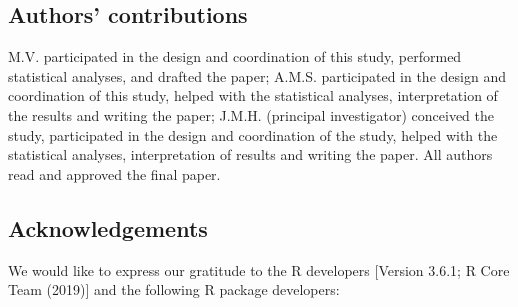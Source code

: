 \documentclass[
  english,
  doc,floatsintext]{apa6}
\begin{document}
\hypertarget{authors-contributions}{%
\subsection{Authors' contributions}\label{authors-contributions}}

M.V. participated in the design and coordination of this study, performed statistical analyses, and drafted the paper; A.M.S. participated in the design and coordination of this study, helped with the statistical analyses, interpretation of the results and writing the paper; J.M.H. (principal investigator) conceived the study, participated in the design and coordination of the study, helped with the statistical analyses, interpretation of results and writing the paper. All authors read and approved the final paper.

\hypertarget{acknowledgements}{%
\subsection{Acknowledgements}\label{acknowledgements}}

We would like to express our gratitude to the R developers {[}Version 3.6.1; R Core Team (2019){]} and the following R package developers:
\end{document}
